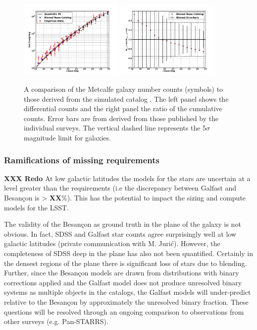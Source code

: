 \documentclass[]{article}
\begin{document}
\begin{figure}[h]
\centering
\includegraphics[width=0.45\textwidth]{validation_figures/Ngals-i.png}
\hfil \includegraphics[width=0.45\textwidth]{validation_figures/CumulativeFraction_i.png}
\caption{A comparison of the Metcalfe galaxy number counts (symbols)
  to those derived from the simulated catalog \label{fig:gcounts}. The
  left panel shows the differential counts and the right panel the
  ratio of the cumulative counts. Error bars are from derived from
  those published by the individual surveys. \label{fig:gratio}
The vertical dashed line represents the
  5$\sigma$ magnitude limit for galaxies.}
\end{figure}

\subsubsection{Ramifications of missing requirements}


{\bf XXX Redo}
At low galactic latitudes the models for the stars are uncertain at a
level greater than the requirements (i.e the discrepancy between
Galfast and Besan\c{c}on is > {\bf XX}\%).  This has the potential to
impact the sizing and compute models for the LSST.

The validity of the Besan\c{c}on as ground truth in the plane of the
galaxy is not obvious.  In fact, SDSS and Galfast star counts agree
surprisingly well at low galactic latitudes (private communication
with M. Juri\'{c}).  However, the completeness of SDSS deep in the
plane has also not been quantified.  Certainly in the densest regions
of the plane there is significant loss of stars due to blending.
Further, since the Besan\c{c}on models are drawn from distributions
with binary corrections applied and the Galfast model does not produce
unresolved binary systems as multiple objects in the catalogs, the
Galfast models will under-predict relative to the Besan\c{c}on by
approximately the unresolved binary fraction.  These questions will be
resolved through an ongoing comparison to observations from other
surveys (e.g. Pan-STARRS).
\end{document}
